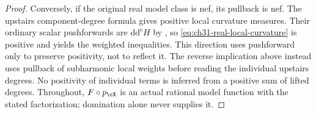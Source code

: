 \begin{proof}
Conversely, if the original real model class is nef, its pullback
is nef.  The upstairs component-degree formula gives positive
local curvature measures.  Their ordinary scalar pushforwards
are \(\mathrm d\mathrm d^cH\) by
\cite[Theorem~3.2.10(i)]{Thu05}, so
\eqref{eq:ch31-real-local-curvature} is positive and yields the
weighted inequalities.  This direction uses pushforward only to
preserve positivity, not to reflect it.
The reverse implication above instead uses pullback of
subharmonic local weights before reading the individual upstairs
degrees.  No positivity of individual terms is inferred from a
positive sum of lifted degrees.
Throughout, \(F\circ p_{\cX}\) is an actual rational model function
with the stated factorization; domination alone never supplies it.
\end{proof}

